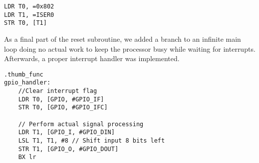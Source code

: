 \begin{lstlisting}[label=iser0-config, caption=Configuring ISER0]
LDR T0, =0x802
LDR T1, =ISER0
STR T0, [T1]
\end{lstlisting}

As a final part of the reset subroutine, we added a branch to an infinite main loop doing no actual work to keep the processor busy while waiting for interrupts. Afterwards, a proper interrupt handler was implemented.

\begin{lstlisting}[label=gpio-handler, caption=GPIO interrupt handler]
.thumb_func
gpio_handler:
    //Clear interrupt flag
    LDR T0, [GPIO, #GPIO_IF]
    STR T0, [GPIO, #GPIO_IFC]

    // Perform actual signal processing
    LDR T1, [GPIO_I, #GPIO_DIN]
    LSL T1, T1, #8 // Shift input 8 bits left
    STR T1, [GPIO_O, #GPIO_DOUT]
    BX lr
\end{lstlisting}
